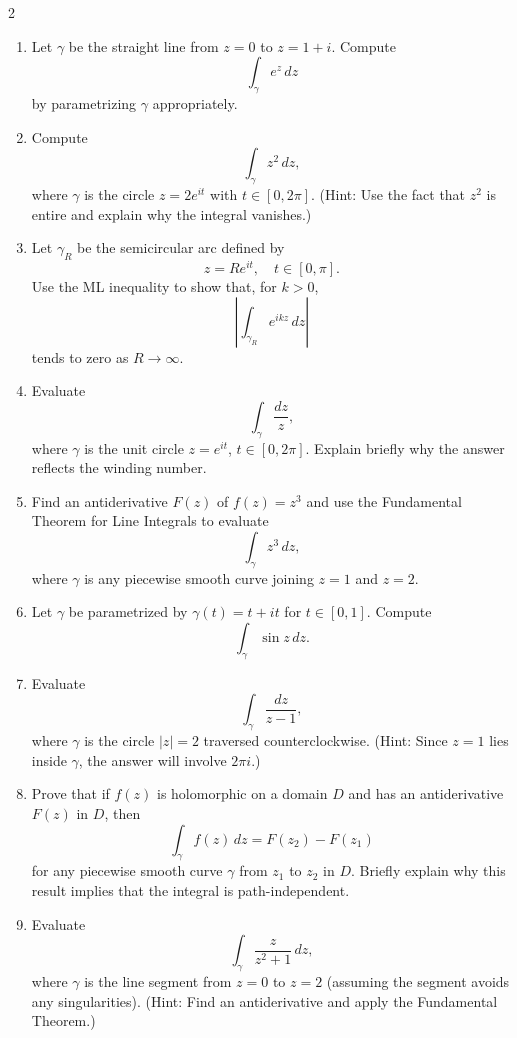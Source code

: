 \begin{multicols}{2}
\begin{enumerate}
  
  \item Let \(\gamma\) be the straight line from \(z=0\) to \(z=1+i\). Compute
  \[
  \int_{\gamma} e^z\,dz
  \]
  by parametrizing \(\gamma\) appropriately.
  
  \item Compute
  \[
  \int_{\gamma} z^2\,dz,
  \]
  where \(\gamma\) is the circle \(z=2e^{it}\) with \(t\in[0,2\pi]\). (Hint: Use the fact that \(z^2\) is entire and explain why the integral vanishes.)
  
  \item Let \(\gamma_R\) be the semicircular arc defined by
  \[
  z=Re^{it},\quad t\in[0,\pi].
  \]
  Use the ML inequality to show that, for \(k>0\),
  \[
  \left|\int_{\gamma_R} e^{ikz}\,dz\right|
  \]
  tends to zero as \(R\to\infty\).
  
  \item Evaluate
  \[
  \int_{\gamma} \frac{dz}{z},
  \]
  where \(\gamma\) is the unit circle \(z=e^{it}\), \(t\in[0,2\pi]\). Explain briefly why the answer reflects the winding number.

  
  \item Find an antiderivative \(F(z)\) of \(f(z)=z^3\) and use the Fundamental Theorem for Line Integrals to evaluate
  \[
  \int_{\gamma} z^3\,dz,
  \]
  where \(\gamma\) is any piecewise smooth curve joining \(z=1\) and \(z=2\).
  
  \item Let \(\gamma\) be parametrized by \(\gamma(t)=t+it\) for \(t\in[0,1]\). Compute
  \[
  \int_{\gamma}\sin z\,dz.
  \]
  
  \item Evaluate
  \[
  \int_{\gamma}\frac{dz}{z-1},
  \]
  where \(\gamma\) is the circle \(|z|=2\) traversed counterclockwise. (Hint: Since \(z=1\) lies inside \(\gamma\), the answer will involve \(2\pi i\).)
  
  \item Prove that if \(f(z)\) is holomorphic on a domain \(D\) and has an antiderivative \(F(z)\) in \(D\), then
  \[
  \int_{\gamma} f(z)\,dz = F(z_2)-F(z_1)
  \]
  for any piecewise smooth curve \(\gamma\) from \(z_1\) to \(z_2\) in \(D\). Briefly explain why this result implies that the integral is path-independent.
  
  \item Evaluate
  \[
  \int_{\gamma} \frac{z}{z^2+1}\,dz,
  \]
  where \(\gamma\) is the line segment from \(z=0\) to \(z=2\) (assuming the segment avoids any singularities). (Hint: Find an antiderivative and apply the Fundamental Theorem.)
  

\end{enumerate}
\end{multicols}

